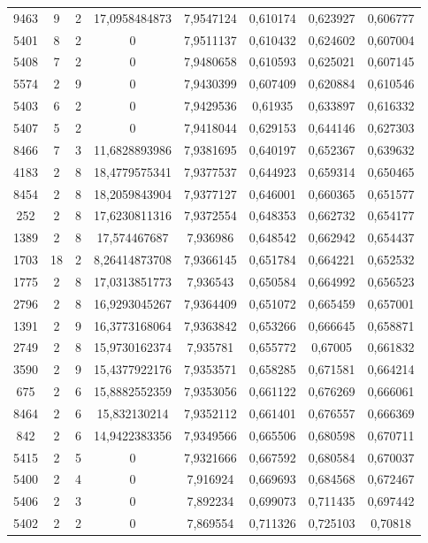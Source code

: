 \begin{longtable}{|c|c|c|c|c|c|c|c|}
9463 & 9 & 2 & 17,0958484873 & 7,9547124 & 0,610174 & 0,623927 & 0,606777 \\
5401 & 8 & 2 & 0 & 7,9511137 & 0,610432 & 0,624602 & 0,607004 \\
5408 & 7 & 2 & 0 & 7,9480658 & 0,610593 & 0,625021 & 0,607145 \\
5574 & 2 & 9 & 0 & 7,9430399 & 0,607409 & 0,620884 & 0,610546 \\
5403 & 6 & 2 & 0 & 7,9429536 & 0,61935 & 0,633897 & 0,616332 \\
5407 & 5 & 2 & 0 & 7,9418044 & 0,629153 & 0,644146 & 0,627303 \\
8466 & 7 & 3 & 11,6828893986 & 7,9381695 & 0,640197 & 0,652367 & 0,639632 \\
4183 & 2 & 8 & 18,4779575341 & 7,9377537 & 0,644923 & 0,659314 & 0,650465 \\
8454 & 2 & 8 & 18,2059843904 & 7,9377127 & 0,646001 & 0,660365 & 0,651577 \\
252 & 2 & 8 & 17,6230811316 & 7,9372554 & 0,648353 & 0,662732 & 0,654177 \\
1389 & 2 & 8 & 17,574467687 & 7,936986 & 0,648542 & 0,662942 & 0,654437 \\
1703 & 18 & 2 & 8,26414873708 & 7,9366145 & 0,651784 & 0,664221 & 0,652532 \\
1775 & 2 & 8 & 17,0313851773 & 7,936543 & 0,650584 & 0,664992 & 0,656523 \\
2796 & 2 & 8 & 16,9293045267 & 7,9364409 & 0,651072 & 0,665459 & 0,657001 \\
1391 & 2 & 9 & 16,3773168064 & 7,9363842 & 0,653266 & 0,666645 & 0,658871 \\
2749 & 2 & 8 & 15,9730162374 & 7,935781 & 0,655772 & 0,67005 & 0,661832 \\
3590 & 2 & 9 & 15,4377922176 & 7,9353571 & 0,658285 & 0,671581 & 0,664214 \\
675 & 2 & 6 & 15,8882552359 & 7,9353056 & 0,661122 & 0,676269 & 0,666061 \\
8464 & 2 & 6 & 15,832130214 & 7,9352112 & 0,661401 & 0,676557 & 0,666369 \\
842 & 2 & 6 & 14,9422383356 & 7,9349566 & 0,665506 & 0,680598 & 0,670711 \\
5415 & 2 & 5 & 0 & 7,9321666 & 0,667592 & 0,680584 & 0,670037 \\
5400 & 2 & 4 & 0 & 7,916924 & 0,669693 & 0,684568 & 0,672467 \\
5406 & 2 & 3 & 0 & 7,892234 & 0,699073 & 0,711435 & 0,697442 \\
5402 & 2 & 2 & 0 & 7,869554 & 0,711326 & 0,725103 & 0,70818 \\

\end{longtable}
